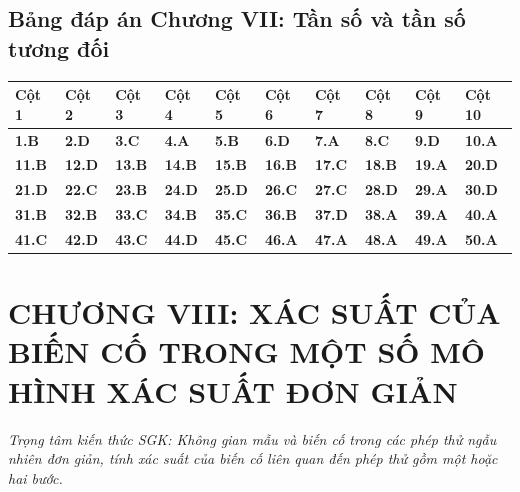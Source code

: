 \documentclass[11pt,a4paper]{article}
\begin{document}
\subsection*{\color{primary} Bảng đáp án Chương VII: Tần số và tần số tương đối}
\begin{center}
\renewcommand{\arraystretch}{1.25}
\begin{tabularx}{\textwidth}{*{10}{>{\centering\arraybackslash}X}}
\toprule
\textbf{\color{primary} Cột 1} & \textbf{\color{primary} Cột 2} & \textbf{\color{primary} Cột 3} & \textbf{\color{primary} Cột 4} & \textbf{\color{primary} Cột 5} & \textbf{\color{primary} Cột 6} & \textbf{\color{primary} Cột 7} & \textbf{\color{primary} Cột 8} & \textbf{\color{primary} Cột 9} & \textbf{\color{primary} Cột 10} \\
\midrule
\textbf{1.B} & \textbf{2.D} & \textbf{3.C} & \textbf{4.A} & \textbf{5.B} & \textbf{6.D} & \textbf{7.A} & \textbf{8.C} & \textbf{9.D} & \textbf{10.A} \\
\rowcolor{rowtint} \textbf{11.B} & \textbf{12.D} & \textbf{13.B} & \textbf{14.B} & \textbf{15.B} & \textbf{16.B} & \textbf{17.C} & \textbf{18.B} & \textbf{19.A} & \textbf{20.D} \\
\textbf{21.D} & \textbf{22.C} & \textbf{23.B} & \textbf{24.D} & \textbf{25.D} & \textbf{26.C} & \textbf{27.C} & \textbf{28.D} & \textbf{29.A} & \textbf{30.D} \\
\rowcolor{rowtint} \textbf{31.B} & \textbf{32.B} & \textbf{33.C} & \textbf{34.B} & \textbf{35.C} & \textbf{36.B} & \textbf{37.D} & \textbf{38.A} & \textbf{39.A} & \textbf{40.A} \\
\textbf{41.C} & \textbf{42.D} & \textbf{43.C} & \textbf{44.D} & \textbf{45.C} & \textbf{46.A} & \textbf{47.A} & \textbf{48.A} & \textbf{49.A} & \textbf{50.A} \\
\bottomrule
\end{tabularx}
\end{center}\vspace{10pt}
\section*{\color{primary} CHƯƠNG VIII: XÁC SUẤT CỦA BIẾN CỐ TRONG MỘT SỐ MÔ HÌNH XÁC SUẤT ĐƠN GIẢN}
\textit{Trọng tâm kiến thức SGK: Không gian mẫu và biến cố trong các phép thử ngẫu nhiên đơn giản, tính xác suất của biến cố liên quan đến phép thử gồm một hoặc hai bước.}\par\vspace{4pt}
\end{document}
